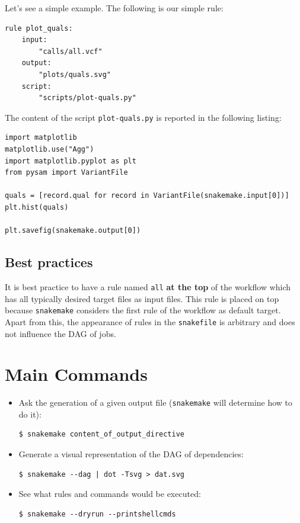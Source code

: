\documentclass[10pt]{article}
\begin{document}
Let's see a simple example. The following is our simple rule:

\begin{lstlisting}[style=mypython]
rule plot_quals:
    input:
        "calls/all.vcf"
    output:
        "plots/quals.svg"
    script:
        "scripts/plot-quals.py"
\end{lstlisting}

The content of the script \texttt{plot-quals.py} is reported in the following listing:

\begin{lstlisting}[style=mypython]
import matplotlib
matplotlib.use("Agg")
import matplotlib.pyplot as plt
from pysam import VariantFile

quals = [record.qual for record in VariantFile(snakemake.input[0])]
plt.hist(quals)

plt.savefig(snakemake.output[0])
\end{lstlisting}

\subsection{Best practices}

It is best practice to have a rule named \texttt{all} \textbf{at the top} of the workflow which has all typically desired target files as input files. This rule is placed on top because \texttt{snakemake} considers the first rule of the workflow as default target. Apart from this, the appearance of rules in the \texttt{snakefile} is arbitrary and does not influence the DAG of jobs.

\section{Main Commands}

\begin{itemize}

    \item Ask the generation of a given output file (\texttt{snakemake} will determine how to do it):

\begin{lstlisting}[style=mybash]
$ snakemake content_of_output_directive
\end{lstlisting}

    \item Generate a visual representation of the DAG of dependencies:
    \begin{lstlisting}[style=mybash]
$ snakemake --dag | dot -Tsvg > dat.svg
    \end{lstlisting}

    \item See what rules and commands would be executed:
    
    \begin{lstlisting}[style=mybash]
$ snakemake --dryrun --printshellcmds
    \end{lstlisting}

\end{itemize}
\end{document}
